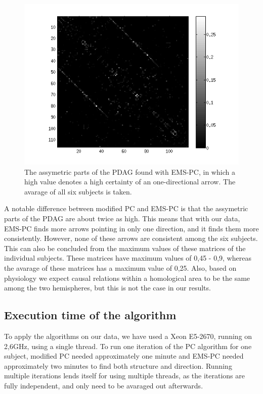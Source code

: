 \documentclass[a4paper, 10pt, english, onecolumn]{article}
\begin{document}
\begin{figure}[h!]
  \centering
  \includegraphics{images/PDAG_avg_antisymmetric_expl}
  \caption{The assymetric parts of the PDAG found with EMS-PC, in which a high value denotes a high certainty of an one-directional arrow. The avarage of all six subjects is taken.}
  \label{fig:pdag_avg_antisymmetric_ems}
\end{figure}


A notable difference between modified PC and EMS-PC is that the assymetric parts of the PDAG are about twice as high. %
This means that with our data, EMS-PC finds more arrows pointing in only one direction, and it finds them more consistently.
However, none of these arrows are consistent among the six subjects.
This can also be concluded from the maximum values of these matrices of the individual subjects.
These matrices have maximum values of 0,45 - 0,9, whereas the avarage of these matrices has a maximum value of 0,25.
Also, based on physiology we expect causal relations within a homological area to be the same among the two hemispheres, but this is not the case in our results.

\subsection{Execution time of the algorithm}
To apply the algorithms on our data, we have used a Xeon E5-2670, running on 2,6GHz, using a single thread.
To run one iteration of the PC algorithm for one subject, modified PC needed approximately one minute and EMS-PC needed approximately two minutes to find both structure and direction.
Running multiple iterations lends itself for using multiple threads, as the iterations are fully independent, and only need to be avaraged out afterwards.
\end{document}
